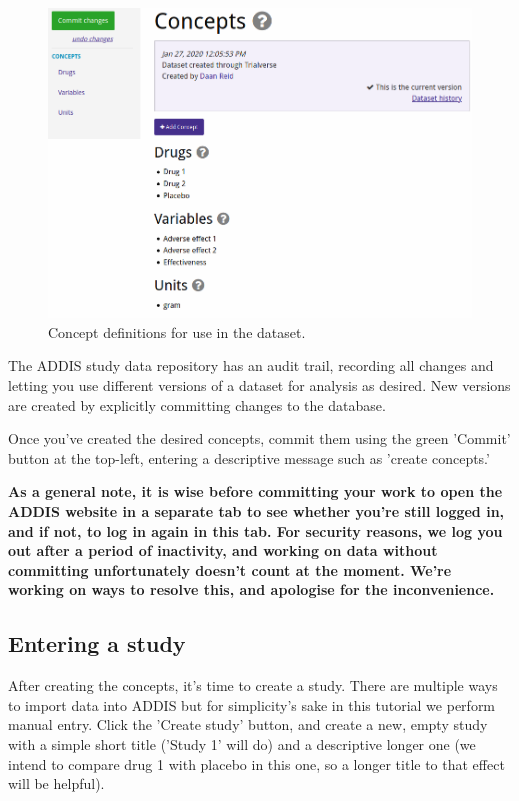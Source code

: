 \documentclass[12pt]{article}
\begin{document}
\begin{figure}[!htbp]
  \centering
  \includegraphics[width=\textwidth]{img/concepts.png}
  \caption{Concept definitions for use in the dataset.}
\label{fig:concepts}
\end{figure}

The ADDIS study data repository has an audit trail, recording all changes and letting you use different versions of a dataset for analysis as desired. New versions are created by explicitly committing changes to the database.

Once you've created the desired concepts, commit them using the green 'Commit' button at the top-left, entering a descriptive message such as 'create concepts.'

\textbf{As a general note, it is wise before committing your work to open the ADDIS website in a separate tab to see whether you're still logged in, and if not, to log in again in this tab. For security reasons, we log you out after a period of inactivity, and working on data without committing unfortunately doesn't count at the moment. We're working on ways to resolve this, and apologise for the inconvenience.}

\subsection{Entering a study}

After creating the concepts, it's time to create a study. There are multiple ways to import data into ADDIS but for simplicity's sake in this tutorial we perform manual entry. Click the 'Create study' button, and create a new, empty study with a simple short title ('Study 1' will do) and a descriptive longer one (we intend to compare drug 1 with placebo in this one, so a longer title to that effect will be helpful).
\end{document}
